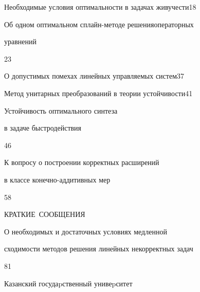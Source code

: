 

{Необходимые условия оптимальности в задачах живучести}{18}




{Об одном оптимальном сплайн-методе решения\newline операторных


уравнений}{23}




{О допустимых помехах линейных управляемых систем}{37}




{Метод унитарных преобразований в теории устойчивости}{41}




{Устойчивость оптимального синтеза


в задаче быстродействия}{46}




{К вопросу о построении корректных расширений


в классе конечно-\newline аддитивных мер}{58}


\bigskip


\bigskip





\centerline{КРАТКИЕ~СООБЩЕНИЯ}


\bigskip







{О необходимых и достаточных условиях медленной\newline


сходимости методов решения линейных некорректных задач}{81}








\vfill


\noindent\raisebox{2pt}{\copyright} Казанский госудаpственный унивеpситет





